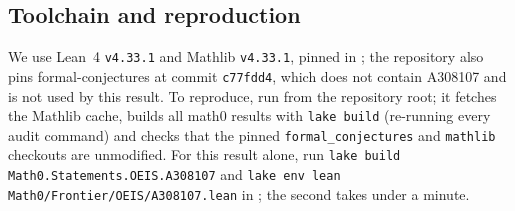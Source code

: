 \documentclass[11pt]{amsart}
\theoremstyle{plain}
\theoremstyle{definition}
\begin{document}
\subsection*{Toolchain and reproduction}
We use Lean~4 \cite{Lean4} \texttt{v4.33.1} and Mathlib \cite{Mathlib} \texttt{v4.33.1}, pinned in ; the repository also pins formal-conjectures \cite{FC} at commit \texttt{c77fdd4}, which does not contain A308107 and is not used by this result.
To reproduce, run  from the repository root; it fetches the Mathlib cache, builds all math0 results with \texttt{lake build} (re-running every audit command) and checks that the pinned \texttt{formal\_conjectures} and \texttt{mathlib} checkouts are unmodified.
For this result alone, run \texttt{lake build Math0.Statements.OEIS.A308107} and \texttt{lake env lean Math0/Frontier/OEIS/A308107.lean} in ; the second takes under a minute.
\end{document}
